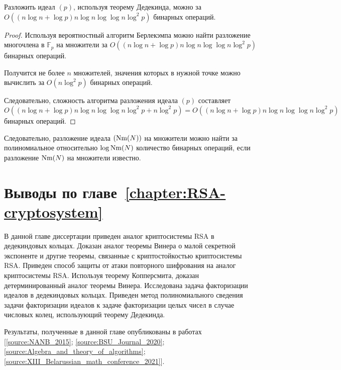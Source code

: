 \documentclass[_00_dissertation.tex]{subfiles}
\begin{document}
\begin{proposition}
    Разложить идеал $(p)$, используя теорему Дедекинда, можно за $O((n\log n + \log p)n\log n\log\log n\log^2 p)$ бинарных операций.
\end{proposition}
\begin{proof}
    Используя вероятностный алгоритм Берлекэмпа можно найти разложение многочлена в $\mathbb{F}_p$ на множители за $O((n\log n + \log p)n\log n\log\log n\log^2 p)$ бинарных операций.
    
    Получится не более $n$ множителей, значения которых в нужной точке можно вычислить за $O(n\log^2 p)$ бинарных операций.

    Следовательно, сложность алгоритма разложения идеала $(p)$ составляет $O((n\log n + \log p)n\log n\log\log n\log^2 p + n\log^2 p) = O((n\log n + \log p)n\log n\log\log n\log^2 p)$ бинарных операций.
\end{proof}

\begin{remark}
    Следовательно, разложение идеала $(\textrm{Nm}(N))$ на множители можно найти за полиномиальное относительно $\log\textrm{Nm}(N)$ количество бинарных операций, если разложение $\textrm{Nm}(N)$ на множители известно.
\end{remark}

\section*{Выводы по главе~\ref{chapter:RSA-cryptosystem}}

В данной главе диссертации приведен аналог криптосистемы RSA в дедекиндовых кольцах.
Доказан аналог теоремы Винера о малой секретной экспоненте и другие теоремы, связанные с криптостойкостью криптосистемы RSA.
Приведен способ защиты от атаки повторного шифрования на аналог криптосистемы RSA.
Используя теорему Копперсмита, доказан детерминированный аналог теоремы Винера.
Исследована задача факторизации идеалов в дедекиндовых кольцах.
Приведен метод полиномиального сведения задачи факторизации идеалов к задаче факторизации целых чисел в случае числовых колец, использующий теорему Дедекинда.

Результаты, полученные в данной главе опубликованы в работах [\ref{source:NANB_2015}; \ref{source:BSU_Journal_2020}; \ref{source:Algebra_and_theory_of_algorithms}; \ref{source:XIII_Belarussian_math_conference_2021}].

\onlyinsubfile{
    
}
\end{document}
